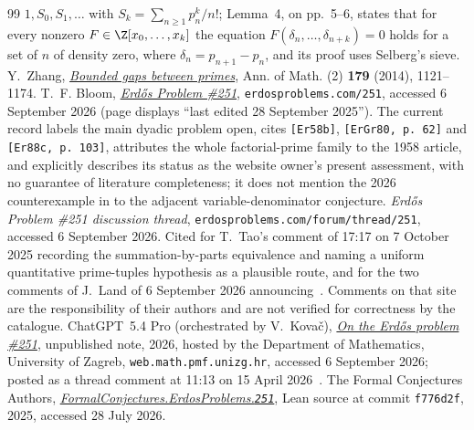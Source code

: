 \documentclass[11pt]{article}
\begin{document}
\begin{thebibliography}{99}
  $1,S_0,S_1,\ldots$ with $S_k=\sum_{n\ge1}p_n^{k}/n!$; Lemma~4, on pp.~5--6,
  states that for every nonzero $F\in\Z[x_0,\ldots,x_k]$ the equation
  $F(\delta_n,\ldots,\delta_{n+k})=0$ holds for a set of $n$ of density zero,
  where $\delta_n=p_{n+1}-p_n$, and its proof uses Selberg's sieve.
 Y.~Zhang,
  \href{https://doi.org/10.4007/annals.2014.179.3.7}
  {\emph{Bounded gaps between primes}},
  Ann. of Math. (2) \textbf{179} (2014), 1121--1174.
 T.~F. Bloom,
  \href{https://www.erdosproblems.com/251}{\emph{Erd\H{o}s Problem \#251}},
  \texttt{erdosproblems.com/251}, accessed 6 September 2026 (page displays
  ``last edited 28 September 2025'').  The current record labels the main
  dyadic problem open, cites \texttt{[Er58b]}, \texttt{[ErGr80, p.~62]} and
  \texttt{[Er88c, p.~103]}, attributes the whole factorial-prime family to the
  1958 article, and explicitly describes its status as the website owner's
  present assessment, with no guarantee of literature completeness; it does
  not mention the 2026 counterexample in \cite{kovac2026} to the adjacent
  variable-denominator conjecture.
 \emph{Erd\H{o}s Problem \#251 discussion
  thread}, \texttt{erdosproblems.com/forum/thread/251}, accessed 6 September
  2026.  Cited for T.~Tao's comment of 17:17 on 7 October 2025 recording the
  summation-by-parts equivalence and naming a uniform quantitative prime-tuples
  hypothesis as a plausible route, and for the two comments of J.~Land of
  6 September 2026 announcing~\cite{land2026}.  Comments on that site are the
  responsibility of their authors and are not verified for correctness by the
  catalogue.
 ChatGPT~5.4 Pro (orchestrated by V.~Kova\v{c}),
  \href{https://web.math.pmf.unizg.hr/~vjekovac/files/Erdos_problem_251.pdf}
  {\emph{On the Erd\H{o}s problem \#251}},
  unpublished note, 2026, hosted by the Department of Mathematics, University
  of Zagreb, \texttt{web.math.pmf.unizg.hr}, accessed 6 September 2026; posted
  as a thread comment at 11:13 on 15 April 2026~\cite{erdosproblems251thread}.
 The Formal Conjectures Authors,
  \href{https://github.com/google-deepmind/formal-conjectures/blob/f776d2f2039351b00737ffcafb9d7d7666e1d9af/FormalConjectures/ErdosProblems/251.lean}
  {\emph{FormalConjectures.ErdosProblems.\texttt{251}}},
  Lean source at commit \texttt{f776d2f}, 2025, accessed 28 July 2026.
\end{thebibliography}
\end{document}

